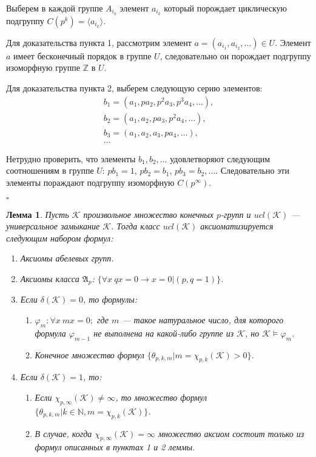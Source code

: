 \documentclass[a4paper,11pt,twoside]{article}
\newtheorem{lemma}{Лемма}[section]
\def\A{{\mathfrak{A}}}
\def\K{{\mathcal{K}}}
\def\Z{{\mathbb{Z}}}
\def\N{{\mathbb{N}}}
\begin{document}
Выберем в каждой группе $A_{i_k}$ элемент $a_{i_k}$ который порождает циклическую подгруппу $C(p^k) = \langle a_{i_k}\rangle$.

Для доказательства пункта 1, рассмотрим элемент $a = (a_{i_1}, a_{i_2}, \ldots) \in U$. Элемент $a$ имеет бесконечный порядок в группе $U$, следовательно он порождает подгруппу изоморфную группе $\Z$ в $U$. 

Для доказательства пункта 2, выберем следующую серию элементов:
$$\begin{array}{l}
b_1 = (a_1, p a_2, p^2 a_3, p^3 a_4, \ldots), \\
b_2 = (a_1, a_2, p a_3, p^2 a_4, \ldots), \\
b_3 = (a_1, a_2, a_3, p a_4, \ldots), \\
\ldots
\end{array}$$

Нетрудно проверить, что элементы $b_1, b_2, \ldots$ удовлетворяют следующим соотношениям в группе $U$: $pb_1 = 1$, $pb_2 = b_1$, $pb_3 = b_2, \ldots$. Следовательно эти элементы пораждают подгруппу изоморфную $C(p^\infty)$.

$\square$


\begin{lemma}
Пусть $\K$ произвольное множество конечных $p$-групп и $ucl(\K)$ --- универсальное замыкание $\K$. Тогда класс $ucl(\K)$ аксиоматизируется следующим набором формул:
\begin{enumerate}
\item Аксиомы абелевых групп.
\item Аксиомы класса $\A_p$: $\{ \forall x \ qx = 0 \rightarrow x = 0 | (p,q = 1) \}$.
\item Если $\delta(\K) = 0$, то формулы:
\begin{enumerate}
\item $\varphi_m: \forall x \ mx = 0;$ где $m$ --- такое натуральное число, для которого формула $\varphi_{m-1}$ не выполнена на какой-либо группе из $\K$, но $\K \models \varphi_m$. 
\item Конечное множество формул $\{\theta_{p,k,m} |  m = \chi_{p,k}(\K) > 0 \}$.
\end{enumerate}
\item Если $\delta(\K) = 1$, то:
\begin{enumerate}
\item Если $\chi_{p, \infty}(\K) \neq \infty$, то множество формул $\{ \theta_{p,k,m} | k \in \N, m = \chi_{p,k}(\K)\}$.
\item В случае, когда $\chi_{p, \infty}(\K) = \infty$ множество аксиом состоит только из формул описанных в пунктах 1 и 2 леммы.
\end{enumerate}
\end{enumerate}
\end{lemma}
\end{document}
